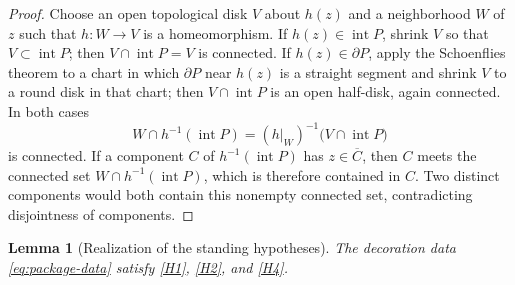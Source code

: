 \documentclass[11pt,reqno]{amsart}
\numberwithin{equation}{section}
\theoremstyle{plain}
\newtheorem{lemma}[theorem]{Lemma}
\theoremstyle{definition}
\theoremstyle{remark}
\begin{document}
\begin{proof}
Choose an open topological disk $V$ about $h(z)$ and a neighborhood $W$
of $z$ such that $h\colon W\to V$ is a homeomorphism.  If
$h(z)\in\operatorname{int}P$, shrink $V$ so that
$V\subset\operatorname{int}P$; then $V\cap\operatorname{int}P=V$ is
connected.  If $h(z)\in\partial P$, apply the Schoenflies theorem to a
chart in which $\partial P$ near $h(z)$ is a straight segment and shrink
$V$ to a round disk in that chart; then $V\cap\operatorname{int}P$ is an
open half-disk, again connected.  In both cases
\[
 W\cap h^{-1}(\operatorname{int}P)
 =
 (h|_W)^{-1}\bigl(V\cap\operatorname{int}P\bigr)
\]
is connected.  If a component $C$ of $h^{-1}(\operatorname{int}P)$ has
$z\in\overline C$, then $C$ meets the connected set
$W\cap h^{-1}(\operatorname{int}P)$, which is therefore contained in
$C$.  Two distinct components would both contain this nonempty
connected set, contradicting disjointness of components.
\end{proof}

\begin{lemma}[Realization of the standing hypotheses]
\label{lem:realization}
The decoration data \eqref{eq:package-data} satisfy
\ref{H1}, \ref{H2}, and \ref{H4}.
\end{lemma}
\end{document}
